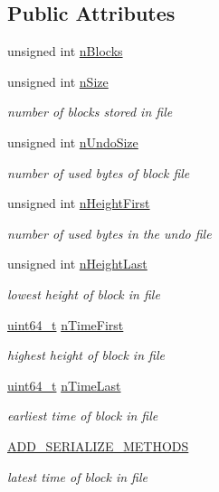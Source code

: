 \subsection*{Public Attributes}
\begin{DoxyCompactItemize}
\item 
unsigned int \hyperlink{class_c_block_file_info_adf2de4bb4d8a0a8f2116ed90f0770d03}{n\+Blocks}
\item 
unsigned int \hyperlink{class_c_block_file_info_afb13102ba49548c24812a4236851c3a9}{n\+Size}
\begin{DoxyCompactList}\small\item\em number of blocks stored in file \end{DoxyCompactList}\item 
unsigned int \hyperlink{class_c_block_file_info_ad3e555fd733ef8f38430554c2db5e9d1}{n\+Undo\+Size}
\begin{DoxyCompactList}\small\item\em number of used bytes of block file \end{DoxyCompactList}\item 
unsigned int \hyperlink{class_c_block_file_info_a66d258b11b1aec30cbacdc6130c271a8}{n\+Height\+First}
\begin{DoxyCompactList}\small\item\em number of used bytes in the undo file \end{DoxyCompactList}\item 
unsigned int \hyperlink{class_c_block_file_info_aabbcf808931e7eaf2278b3d7172fad3a}{n\+Height\+Last}
\begin{DoxyCompactList}\small\item\em lowest height of block in file \end{DoxyCompactList}\item 
\hyperlink{stdint_8h_aaa5d1cd013383c889537491c3cfd9aad}{uint64\+\_\+t} \hyperlink{class_c_block_file_info_a0e928257d1f003ede485ce49e8cf9189}{n\+Time\+First}
\begin{DoxyCompactList}\small\item\em highest height of block in file \end{DoxyCompactList}\item 
\hyperlink{stdint_8h_aaa5d1cd013383c889537491c3cfd9aad}{uint64\+\_\+t} \hyperlink{class_c_block_file_info_a1d12e4202474bb2f299d18d7d1f28c78}{n\+Time\+Last}
\begin{DoxyCompactList}\small\item\em earliest time of block in file \end{DoxyCompactList}\item 
\hyperlink{class_c_block_file_info_ab4daf4df00f90dee15e3a7d2cdb7a273}{A\+D\+D\+\_\+\+S\+E\+R\+I\+A\+L\+I\+Z\+E\+\_\+\+M\+E\+T\+H\+O\+D\+S}
\begin{DoxyCompactList}\small\item\em latest time of block in file \end{DoxyCompactList}\end{DoxyCompactItemize}


